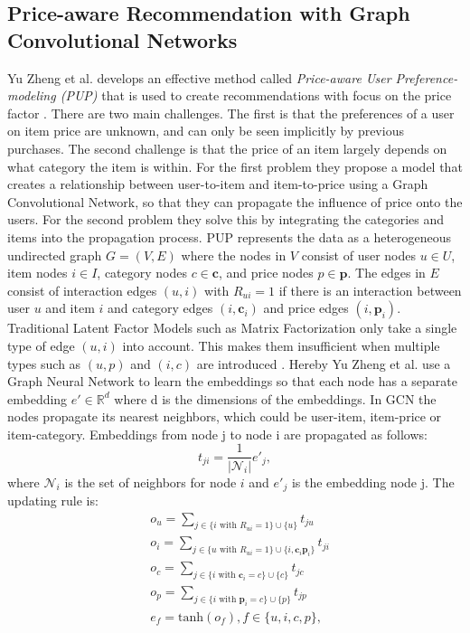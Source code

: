 \subsection{Price-aware Recommendation with Graph Convolutional Networks}
Yu Zheng et al. develops an effective method called \textit{Price-aware User Preference-modeling (PUP)} that is used to create recommendations with focus on the price factor \cite{Priceaware}.
There are two main challenges.
The first is that the preferences of a user on item price are unknown, and can only be seen implicitly by previous purchases.
The second challenge is that the price of an item largely depends on what category the item is within.
For the first problem they propose a model that creates a relationship between user-to-item and item-to-price using a Graph Convolutional Network, so that they can propagate the influence of price onto the users.
For the second problem they solve this by integrating the categories and items into the propagation process.
PUP represents the data as a heterogeneous undirected graph $G = (V,E)$ where the nodes in $V$ consist of user nodes $u \in U$, item nodes $i \in I$, category nodes $c \in \textbf{c}$, and price nodes $p \in \textbf{p}$.
The edges in $E$ consist of interaction edges $(u, i)$ with $R_{ui} = 1$ if there is an interaction between user $u$ and item $i$ and category edges $(i, \textbf{c}_i)$ and price edges $(i, \textbf{p}_i)$.
Traditional Latent Factor Models such as Matrix Factorization only take a single type of edge $(u, i)$ into account.
This makes them insufficient when multiple types such as $(u, p)$ and $(i, c)$ are introduced \cite{Priceaware}.
Hereby Yu Zheng et al. use a Graph Neural Network to learn the embeddings so that each node has a separate embedding $e' \in \mathbb{R}^d$ where d is the dimensions of the embeddings.
In GCN the nodes propagate its nearest neighbors, which could be user-item, item-price or item-category.
Embeddings from node j to node i are propagated as follows:
\begin{equation}
    t_{ji} = \frac{1}{|\mathcal{N}_i|}e'_j,
\end{equation}
where $\mathcal{N}_i$ is the set of neighbors for node $i$ and $e'_j$ is the embedding node j.
The updating rule is:
\begin{align*}
     & o_u = \sum_{j \in \{i \textrm{ with } R_{ui}=1 \} \cup \{ u\}}^{} t_{ju}                            \\
     & o_i = \sum_{j \in \{u \textrm{ with } R_{ui}=1 \} \cup \{ i, \textbf{c}_i \textbf{p}_i\}}^{} t_{ji} \\
     & o_c = \sum_{j \in \{i \textrm{ with } \textbf{c}_i=c \} \cup \{ c\}}^{} t_{jc}                      \\
     & o_p = \sum_{j \in \{i \textrm{ with } \textbf{p}_i=c \} \cup \{ p\}}^{} t_{jp}                      \\
     & e_f = \textrm{tanh}(o_f), f \in \{u, i, c, p\},
\end{align*}
